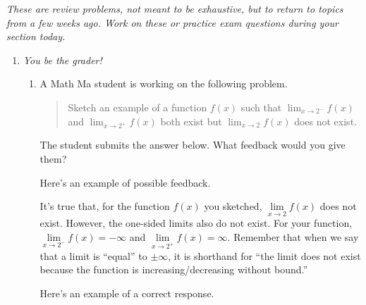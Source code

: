 \documentclass{article}
\begin{document}
\emph{These are review problems, not meant to be exhaustive, but to return to topics from a few weeks ago. Work on these or practice exam questions during your section today.}
\begin{enumerate}
\item  \emph{You be the grader!}

  \begin{enumerate}
  \item
    \begin{problem}[0.25in]
      A Math Ma student is working on the following problem.
      \begin{quote}
        Sketch an example of a function $f(x)$ such that $\displaystyle
        \lim_{x \to 2^-} f(x)$ and $\displaystyle \lim_{x \to 2^+}
        f(x)$ both exist but $\displaystyle \lim_{x \to 2} f(x)$ does not
        exist. 
      \end{quote}
      The student submits the answer below. What feedback would you give them?

    \end{problem}

    \begin{solution}
      Here's an example of possible feedback.

      It's true that, for the function $f(x)$ you sketched, 
      $\lim\limits_{x \to 2} f(x)$ does not exist. However, the one-sided
      limits also do not exist. For your function, 
      $\lim\limits_{x \to 2^-} f(x) = -\infty$
      and $\lim\limits_{x \to 2^+} f(x) = \infty$. Remember that
      when we say that a limit is ``equal'' to $\pm \infty$, it is shorthand
      for ``the limit does not exist because the function is
      increasing/decreasing without bound.''

      Here's an example of a correct response.
      
      

\end{solution}
\end{enumerate}
\end{enumerate}
\end{document}
